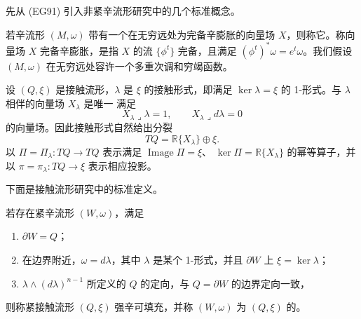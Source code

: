 先从 (EG91) 引入非紧辛流形研究中的几个标准概念。

\begin{definition}
\label{def:convex-at-infinity}
若辛流形 $(M,\omega)$ 带有一个在无穷远处为完备辛膨胀的向量场 $X$，则称它\termConvexAtInfinity{}。称向量场 $X$ 完备辛膨胀，是指 $X$ 的流
$\{\phi^t\}$ 完备，且满足 $(\phi^t)^*\omega=e^t\omega$。我们假设
$(M,\omega)$ 在无穷远处容许一个多重次调和穷竭函数。
\end{definition}

设 $(Q,\xi)$ 是接触流形，$\lambda$ 是 $\xi$ 的接触形式，即满足
$\ker\lambda=\xi$ 的 1-形式。与 $\lambda$ 相伴的\personReeb{}向量场 $X_\lambda$ 是唯一
满足
\begin{equation}
 X_\lambda\mathbin\lrcorner\lambda=1,
 \qquad X_\lambda\mathbin\lrcorner d\lambda=0
\label{eq:17-reeb-definition}
\end{equation}
的向量场。因此接触形式自然给出分裂
\[
 TQ=\mathbb R\{X_\lambda\}\oplus\xi.
\]
以 $\Pi=\Pi_\lambda:TQ\to TQ$ 表示满足
$\operatorname{Image}\Pi=\xi$、
$\ker\Pi=\mathbb R\{X_\lambda\}$ 的幂等算子，并以
$\pi=\pi_\lambda:TQ\to\xi$ 表示相应投影。

下面是接触流形研究中的标准定义。

\begin{definition}
\label{def:strong-symplectic-filling}
若存在紧辛流形 $(W,\omega)$，满足
\begin{enumerate}[label=(\alph*)]
\item $\partial W=Q$；
\item 在边界附近，$\omega=d\lambda$，其中 $\lambda$ 是某个 1-形式，并且
$\partial W$ 上 $\xi=\ker\lambda$；
\item $\lambda\wedge(d\lambda)^{n-1}$ 所定义的 $Q$ 的定向，与
$Q=\partial W$ 的边界定向一致，
\end{enumerate}
则称紧接触流形 $(Q,\xi)$ 强辛可填充，并称 $(W,\omega)$ 为 $(Q,\xi)$ 的\termStrongSymplecticFilling{}。
\end{definition}

